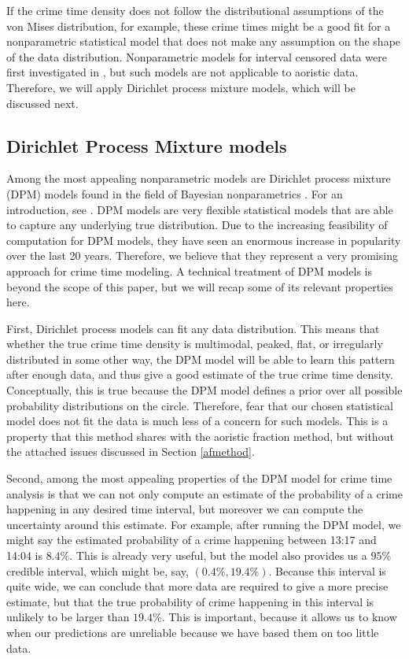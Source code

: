 If the crime time density does not follow the distributional assumptions of the von Mises distribution, for example, these crime times might be a good fit for a nonparametric statistical model that does not make any assumption on the shape of the data distribution. Nonparametric models for interval censored data were first investigated in \citet{turnbull1974nonparametric, turnbull1976empirical}, but such models are not applicable to aoristic data. Therefore, we will apply  Dirichlet process mixture models, which will be discussed next.

\subsection{Dirichlet Process Mixture models}

Among the most appealing nonparametric models are Dirichlet process mixture (DPM) models \citep{ferguson1973bayesian, antoniak1974mixtures, neal2000markov} found in the field of Bayesian nonparametrics \citep{hjort2010bayesian}. For an introduction, see \citet[ch. 23]{gelman2003bayesian}.  DPM models are very flexible statistical models that are able to capture any underlying true distribution. Due to the increasing feasibility of computation for DPM models, they have seen an enormous increase in popularity over the last 20 years. Therefore, we believe that they represent a very promising approach for crime time modeling. A technical treatment of DPM models is beyond the scope of this paper, but we will recap some of its relevant properties here.

First, Dirichlet process models can fit any data distribution. This means that whether the true crime time density is multimodal, peaked, flat, or irregularly distributed in some other way, the DPM model will be able to learn this pattern after enough data, and thus give a good estimate of the true crime time density. Conceptually, this is true because the DPM model defines a prior over all possible probability distributions on the circle. Therefore, fear that our chosen statistical model does not fit the data is much less of a concern for such models. This is a property that this method shares with the aoristic fraction method, but without the attached issues discussed in Section \ref{afmethod}.

Second, among the most appealing properties of the DPM model for crime time analysis is that we can not only compute an estimate of the probability of a crime happening in any desired time interval, but moreover we can compute the uncertainty around this estimate. For example, after running the DPM model, we might say the estimated probability of a crime happening between 13:17 and 14:04 is $8.4\%.$ This is already very useful, but the model also provides us a $95\%$ credible interval, which  might be, say, $(0.4\%, 19.4\%).$ Because this interval is quite wide, we can conclude that more data are required to give a more precise estimate, but that the true probability of crime happening in this interval is unlikely to be larger than $19.4\%.$ This is important, because it allows us to know when our predictions are unreliable because we have based them on too little data.

